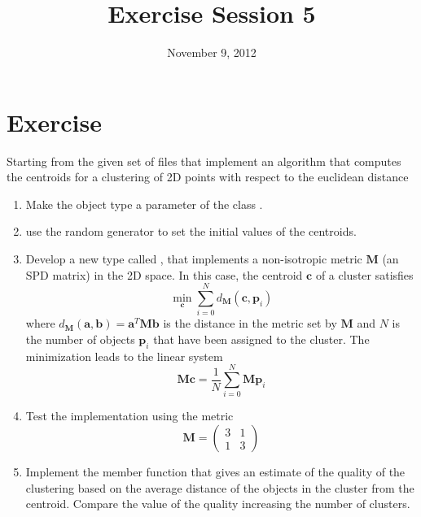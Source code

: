 \documentclass[10pt,a4paper]{article}
\title{Exercise Session 5}
\date{November 9, 2012}
\newcommand*{\vect}[1]{\boldsymbol{#1}}
\newcommand*{\mat}[1]{\boldsymbol{#1}}
\begin{document}
\lstset{language=[ISO]C++}
\maketitle

\section*{Exercise}

Starting from the given set of files that implement an algorithm that computes
the centroids for a clustering of 2D points with respect to the euclidean
distance

\begin{enumerate}

\item Make the object type a parameter of the class .

\item use the random generator to set the initial values of the centroids.

\item Develop a new  type called , that
implements a non-isotropic metric $\mat{M}$ (an SPD matrix) in the 2D space. In
this case, the centroid $\vect{c}$ of a cluster satisfies
\[
\min_{\vect{c}} \sum_{i=0}^N d_{\mat{M}}( \vect{c}, \vect{p}_i )
\]
where $d_{\mat{M}}( \vect{a}, \vect{b} ) = \vect{a}^T \mat{M} \vect{b}$ is
the distance in the metric set by $\mat{M}$ and $N$ is the number of objects
$\vect{p}_i$ that have been assigned to the cluster. The minimization leads to
the linear system
\[
\mat{M} \vect{c} = \frac{1}{N} \sum_{i=0}^N \mat{M} \vect{p}_i
\]

\item Test the implementation using the metric
\[
\mat{M} =
\begin{pmatrix}
3 & 1 \\ 1 & 3
\end{pmatrix}
\]

\item Implement the  member function that gives an estimate
of the quality of the clustering based on the average distance of the objects
in the cluster from the centroid. Compare the value of the quality increasing
the number of clusters.

\end{enumerate}

%
%
\end{document}
